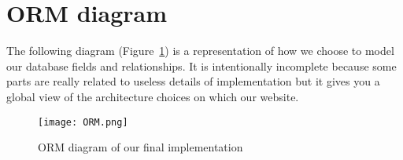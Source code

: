 \section{ORM diagram}
\label{sec:ORM diagram}

The following diagram (Figure~\ref{fig:ORM_diagram}) is a representation of how
we choose to model our database fields and relationships. It is intentionally
incomplete because some parts are really related to useless details of
implementation but it gives you a global view of the architecture choices
on which our website. \newline

\begin{figure}[!ht]
    \centering
    \texttt{[image: ORM.png]}
    \caption{ORM diagram of our final implementation}
    \label{fig:ORM_diagram}
\end{figure}
\FloatBarrier
